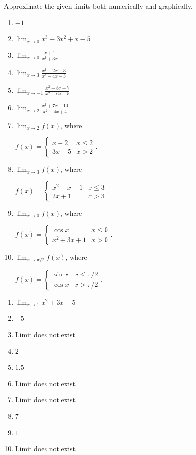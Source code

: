 \begin{multicols}{2}
\begin{enumialphparenastyle}
\begin{ex}
Approximate the given limits both numerically and graphically.
\begin{enumerate}
\item {$-1$}
\item {$\displaystyle \lim_{x\to 0} x^3-3x^2+x-5$}
\item {$\displaystyle \lim_{x\to 0} \frac{x+1}{x^2+3x}$}
\item {$\displaystyle \lim_{x\to 3} \frac{x^2-2x-3}{x^2-4x+3}$}
\item {$\displaystyle \lim_{x\to -1} \frac{x^2+8x+7}{x^2+6x+5}$}
\item {$\displaystyle \lim_{x\to 2} \frac{x^2+7x+10}{x^2-4x+4}$}
\item {$\displaystyle \lim_{x\to 2} f(x)$, where 

$f(x) = \left\{\begin{array}{cl} x+2 & x\leq 2 \\ 3x-5 & x>2 \end{array}\right.$.
}
\item {$\displaystyle \lim_{x\to 3} f(x)$, where 

$f(x) = \left\{\begin{array}{cl} x^2-x+1 & x\leq 3 \\ 2x+1 & x>3 \end{array}\right.$.}
\item {$\displaystyle \lim_{x\to 0} f(x)$, where 

$f(x) = \left\{\begin{array}{cl} \cos x & x\leq 0 \\ x^2+3x+1 & x>0 \end{array}\right.$.}
\item  {$\displaystyle \lim_{x\to \pi/2} f(x)$, where 

$f(x) = \left\{\begin{array}{cl} \sin x & x\leq \pi/2 \\ \cos x & x>\pi/2 \end{array}\right.$.}
\end{enumerate}

\begin{sol}
\begin{enumerate}
\item {$\displaystyle \lim_{x\to 1} x^2+3x-5$}
\item {$-5$}
\item {Limit does not exist}
\item  {$2$}
\item {$1.5$}
\item 
{Limit does not exist.}
\item 
{Limit does not exist.}
\item 
{$7$}
\item 
{$1$}
\item 
{Limit does not exist.}


\end{enumerate}
\end{sol}
\end{ex}
\end{enumialphparenastyle}
\end{multicols}
